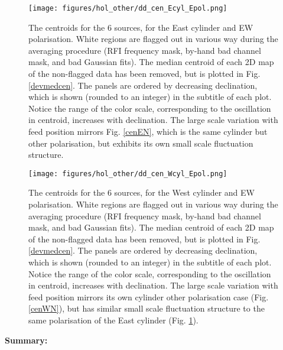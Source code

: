 \begin{figure}[h!]
\begin{center}
\texttt{[image: figures/hol\_other/dd\_cen\_Ecyl\_Epol.png]}
\caption{The centroids for the 6 sources, for the East cylinder and EW polarisation. White regions are flagged out in various way during the averaging procedure (RFI frequency mask, by-hand bad channel mask, and bad Gaussian fits). The median centroid of each 2D map of the non-flagged data has been removed, but is plotted in Fig. \ref{devmedcen}. The panels are ordered by decreasing declination, which is shown (rounded to an integer) in the subtitle of each plot. Notice the range of the color scale, corresponding to the oscillation in centroid, increases with declination. \newline The large scale variation with feed position mirrors Fig. \ref{cenEN}, which is the same cylinder but other polarisation, but exhibits its own small scale fluctuation structure.}
\label{cenEE}
\end{center}
\end{figure}

\begin{figure}[h!]
\begin{center}
\texttt{[image: figures/hol\_other/dd\_cen\_Wcyl\_Epol.png]}
\caption{The centroids for the 6 sources, for the West cylinder and EW polarisation. White regions are flagged out in various way during the averaging procedure (RFI frequency mask, by-hand bad channel mask, and bad Gaussian fits). The median centroid of each 2D map of the non-flagged data has been removed, but is plotted in Fig. \ref{devmedcen}. The panels are ordered by decreasing declination, which is shown (rounded to an integer) in the subtitle of each plot. Notice the range of the color scale, corresponding to the oscillation in centroid, increases with declination. 
\newline The large scale variation with feed position mirrors its own cylinder other polarisation case (Fig. \ref{cenWN}), but has similar small scale fluctuation structure to the same polarisation of the East cylinder (Fig. \ref{cenEE}).}
\label{cenWE}
\end{center}
\end{figure}

\textbf{Summary:}

